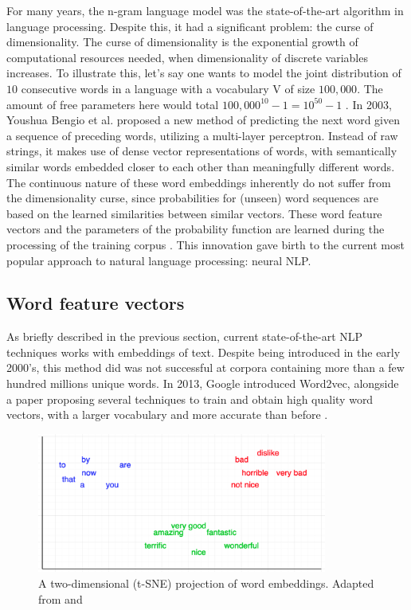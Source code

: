 \documentclass[twoside]{uva-inf-bachelor-thesis}
\begin{document}
For many years, the n-gram language model was the state-of-the-art algorithm in language processing. Despite this, it had a significant problem: the curse of dimensionality. The curse of dimensionality is the exponential growth of computational resources needed, when dimensionality of discrete variables increases. To illustrate this, let's say one wants to model the joint distribution of $10$ consecutive words in a language with a vocabulary V of size $100,000$. The amount of free parameters here would total $100,000^{10}-1 = 10^{50}-1$ \cite{bengio03}. 
In 2003, Youshua Bengio et al. proposed a new method of predicting the next word given a sequence of preceding words, utilizing a multi-layer perceptron. Instead of raw strings, it makes use of dense vector representations of words, with semantically similar words embedded closer to each other than meaningfully different words. The continuous nature of these word embeddings inherently do not suffer from the dimensionality curse, since probabilities for (unseen) word sequences are based on the learned similarities between similar vectors. These word feature vectors and the parameters of the probability function are learned during the processing of the training corpus \cite{bengio03}. This innovation gave birth to the current most popular approach to natural language processing: neural NLP.

\subsection{Word feature vectors}
As briefly described in the previous section, current state-of-the-art NLP techniques works with embeddings of text. Despite being introduced in the early 2000's, this method did was not successful at corpora containing more than a few hundred millions unique words. In 2013, Google introduced Word2vec, alongside a paper proposing several techniques to train and obtain high quality word vectors, with a larger vocabulary and more accurate than before \cite{mikolov13}.


\begin{figure}
    \centering
    \includegraphics[width=0.85\textwidth]{images/embeddings.png}
    \caption{A two-dimensional (t-SNE) projection of word embeddings. Adapted from \cite{Manning99} and \cite{li16}}
    \label{fig:embeddings}
\end{figure}
\end{document}
